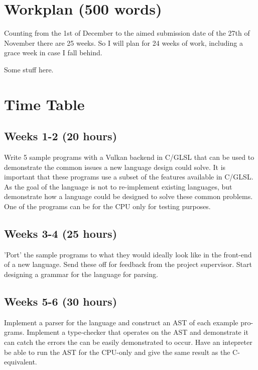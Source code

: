 \documentclass[11pt]{article}
\begin{document}
\section{Workplan (500 words)}

Counting from the 1st of December to the aimed submission date of the 27th of
November there are 25 weeks. So I will plan for 24 weeks of work, including a
grace week in case I fall behind.

Some stuff here.




\newpage
\appendix

\section{Time Table}

\subsection{Weeks 1-2 (20 hours)}

Write 5 sample programs with a Vulkan backend in C/GLSL that can be used to
demonstrate the common issues a new language design could solve. It is
important that these programs use a subset of the features available in C/GLSL.
As the goal of the language is not to re-implement existing languages, but
demonstrate how a language could be designed to solve these common problems.
One of the programs can be for the CPU only for testing purposes.

\subsection{Weeks 3-4 (25 hours)}

'Port' the sample programs to what they would ideally look like in the
front-end of a new language. Send these off for feedback from the project
supervisor. Start designing a grammar for the language for parsing.

\subsection{Weeks 5-6 (30 hours)}

Implement a parser for the language and construct an AST of each example pro-
grams. Implement a type-checker that operates on the AST and demonstrate it can
catch the errors the can be easily demonstrated to occur. Have an intepreter be
able to run the AST for the CPU-only and give the same result as the
C-equivalent.
\end{document}

